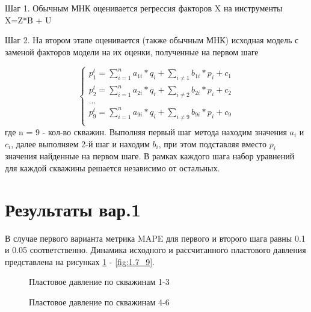 \documentclass[14pt]{article}
\begin{document}
Шаг 1. Обычным МНК оценивается регрессия факторов X на инструменты X=Z*B + U

Шаг 2. На втором этапе оценивается (также обычным МНК) исходная модель с заменой факторов модели на их оценки, полученные на первом шаге

\begin{equation*} \label{sle}
	\begin{cases}
		p_1^t = \sum_{i=1}^{n} a_{1i}*q_i + \sum_{i\not=1}b_{1i}*p_i + c_1 \\
		p_2^t = \sum_{i=1}^{n} a_{2i}*q_i + \sum_{i\not=2}b_{2i}*p_i + c_2 \\
		...\\
		p_9^t = \sum_{i=1}^{n} a_{9i}*q_i + \sum_{i\not=9}b_{9i}*p_i + c_9 \\
	\end{cases}
\end{equation*}
где n = 9 - кол-во скважин.
Выполняя первый шаг метода находим значения $a_i$ и $c_i$, далее выполняем 2-й шаг и находим $b_i$, при этом подставляя вместо $p_i$ значения найденные на первом шаге. В рамках каждого шага набор уравнений для каждой скважины решается независимо от остальных.
	\section{Результаты вар.1}
В случае первого варианта метрика MAPE для первого и второго шага равны 0.1 и 0.05 соответственно. Динамика исходного и рассчитанного пластового давления представлена на рисунках \ref{fig:1.1_3} - \ref{fig:1.7_9}.
	

\begin{figure}
	\caption{Пластовое давление по скважинам 1-3}
	\label{fig:1.1_3}
\end{figure}

\begin{figure}
	\caption{Пластовое давление по скважинам 4-6}
	\label{fig:1.4_6}
\end{figure}
\end{document}
